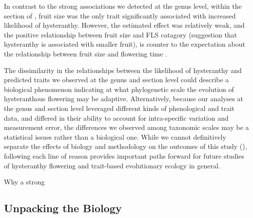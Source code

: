 \documentclass{article}\usepackage[]{graphicx}\usepackage[]{color}
\begin{document}
\noindent In contrast to the strong associations we detected at the genus level, within the section of , fruit size was the only trait significantly associated with increased likelihood of hysteranthy. However, the estimated effect was relatively weak, and the positive relationship between fruit size and FLS catagory (suggestion that hysteranthy is associated with smaller fruit), is counter to the expectation about the relationship between fruit size and flowering time \citep{}.

\noindent The dissimilarity in the relationships between the likelihood of hysteranthy and predicted traits we observed at the genus and section level could describe a biological phenomenon indicating at what phylogenetic scale the evolution of hysteranthous flowering may be adaptive. Alternatively, because our analyses at the genus and section level leveraged different kinds of phenological and trait data, and differed in their ability to account for intra-specific variation and  measurement error, the differences we observed among taxonomic scales may be a statistical issues rather than a biological one. While we cannot definitively separate the effects of biology and methodology on the outcomes of this study (), following each line of reason provides important paths forward for future studies of hysteranthy flowering and trait-based evolutionary ecology in general.

Why a strong





\noindent  

\subsection*{Unpacking the Biology}
\end{document}
